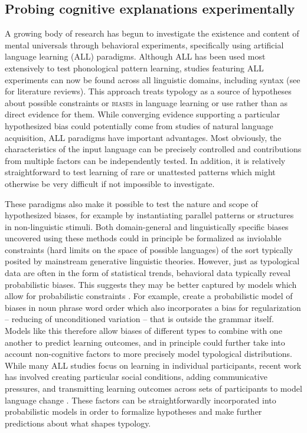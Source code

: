 \documentclass[output=paper]{langsci/langscibook}
\begin{document}
\subsection{Probing cognitive explanations experimentally}
A growing body of research has begun to investigate the existence and content of mental universals through behavioral experiments, specifically using artificial language learning (ALL)  paradigms. Although ALL has been used most extensively to test phonological pattern learning, studies featuring ALL experiments can now be found across all linguistic domains, including syntax (see \citealt{Moreton2012structure,Culbertson12Compass} for literature reviews). This approach treats typology as a source of hypotheses about possible constraints or \textsc{biases}  in language learning or use rather than as direct evidence for them. While converging evidence supporting a particular hypothesized bias could potentially come from studies of natural language acquisition, ALL paradigms have important advantages. Most obviously, the characteristics of the input language can be precisely controlled and contributions from multiple factors can be independently tested. In addition, it is relatively straightforward to test learning of rare or unattested patterns which might otherwise be very difficult if not impossible to investigate. 

These paradigms also make it possible to test the nature and scope of hypothesized biases, for example by instantiating parallel patterns or structures in non-linguistic stimuli. Both domain-general and linguistically specific biases uncovered using these methods could in principle be formalized as inviolable constraints (hard limits on the space of possible languages) of the sort typically posited by mainstream generative linguistic theories. However, just as typological data are often in the form of statistical trends, behavioral data typically reveal probabilistic biases. This suggests they may be better captured by models which allow for probabilistic  constraints   \citep[e.g., using Maximum Entropy or Probabilistic Harmonic Grammar formalisms;][]{GoldwaterJohnson03, Wilson06}. For example, \cite{culbertson2013cognitive} create a probabilistic model of biases in noun phrase word order which also incorporates a bias for regularization -- reducing of unconditioned variation -- that is outside the grammar itself. Models like this therefore allow biases of different types to combine with one another to predict learning outcomes, and in principle could further take into account non-cognitive factors to more precisely model typological distributions. While many ALL studies focus on learning in individual participants, recent work has involved creating particular social conditions, adding communicative pressures, and transmitting learning outcomes across sets of participants to model language change \citep[e.g.,][]{fay2010interactive,kirby2015compression,Kirbyetal08}. These factors can be straightforwardly incorporated into probabilistic models in order to formalize hypotheses and make further predictions about what shapes typology.
\end{document}
